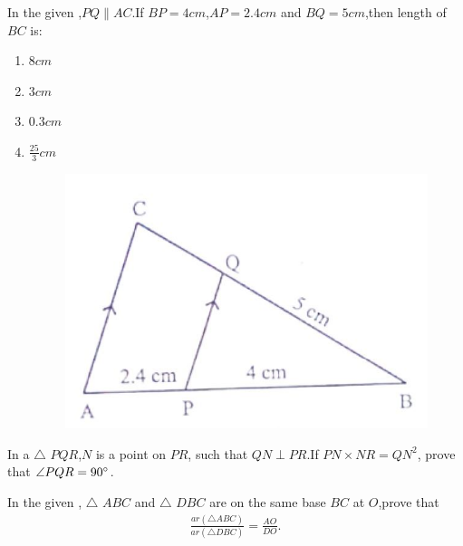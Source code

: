     \item  In the given ,$PQ \parallel AC$.If $BP = 4 cm$,$AP = 2.4 cm$ and $BQ = 5 cm$,then length of $BC$ is:
    \begin{enumerate}[label=(\alph*)]
        \item $8 cm$
        \item $3 cm$
        \item $0.3 cm$
        \item $\frac{25}{3}cm$
          \begin{figure}[H]
  \centering
  \includegraphics[width=\columnwidth]{figs/right angle triangle.jpeg}
  \caption{}
  \label{fig:figure1}
\end{figure}
    \end{enumerate}
		\pagebreak
       \item  In a $\triangle$  $PQR$,$N$ is a point on $PR$, such that $QN \perp PR$.If $PN \times NR = QN^2$, prove that $\angle PQR = 90 \degree$.
    \item   In the given , $\triangle$ $ABC$ and  $\triangle$ $DBC$ are on the same base $BC$ at $O$,prove that
    \begin{align}
         \frac{ar (\triangle  ABC)}{ar (\triangle DBC)} = \frac{AO}{DO}.
    \end{align}
